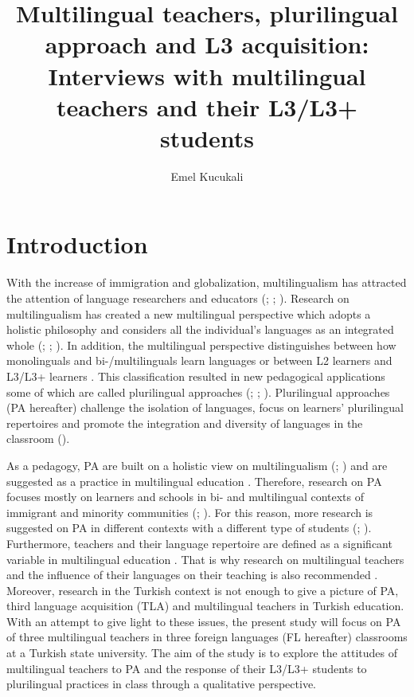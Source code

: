 \documentclass[output=paper]{../langscibook}
\author{Emel Kucukali\affiliation{Marmara University}\orcid{}}
\title{Multilingual teachers, plurilingual approach and L3 acquisition:  Interviews with multilingual teachers and their L3/L3+ students}
\begin{document}
\maketitle


\section{Introduction}


With the increase of immigration and globalization, multilingualism has attracted the attention of language researchers and educators (\citealt{CenozGenesee1998}; \citealt{Jessner1999}; \citealt{Cenoz2013a}). Research on multilingualism has created a new multilingual perspective which adopts a holistic philosophy and considers all the individual’s languages as an integrated whole (\citealt{Cook1992}; \citealt{Grosjean2008}; \citealt{Cenoz2013a}). In addition, the multilingual perspective distinguishes between how monolinguals and bi-\slash multilinguals learn languages or between L2 learners and L3/L3+ learners \citep{Hufeisen2004}. This classification resulted in new pedagogical applications some of which are called plurilingual approaches (\citealt{CouncilOfEurope2001}; \citealt{Cenoz2013a,Cenoz2013b}; \citealt{Otwinowska2014}). Plurilingual approaches (PA hereafter) challenge the isolation of languages, focus on learners' plurilingual repertoires and promote the integration and diversity of languages in the classroom (\citealt{BeaccoEtAl2010}).

As a pedagogy, PA are built on a holistic view on multilingualism (\citealt{Grosjean2008}; \citealt{Cenoz2013a,Cenoz2013b}) and are suggested as a practice in multilingual education \citep{Cenoz2009}. Therefore, research on PA focuses mostly on learners and schools in bi- and multilingual contexts of immigrant and minority communities (\citealt{Cenoz2013b}; \citealt{GarciaLi2014}). For this reason, more research is suggested on PA in different contexts with a different type of students (\citealt{Cenoz2013a,Cenoz2013b}; \citealt{CenozGorter2017}). Furthermore, teachers and their language repertoire are defined as a significant variable in multilingual education \citep{Cenoz2009}. That is why research on multilingual teachers and the influence of their languages on their teaching is also recommended \citep{Ellis2013}. Moreover, research in the Turkish context is not enough to give a picture of PA, third language acquisition (TLA) and multilingual teachers in Turkish education. With an attempt to give light to these issues, the present study will focus on PA of three multilingual teachers in three foreign languages (FL hereafter) classrooms at a Turkish state university. The aim of the study is to explore the attitudes of multilingual teachers to PA and the response of their L3/L3+ students to plurilingual practices in class through a qualitative perspective.~
\end{document}
